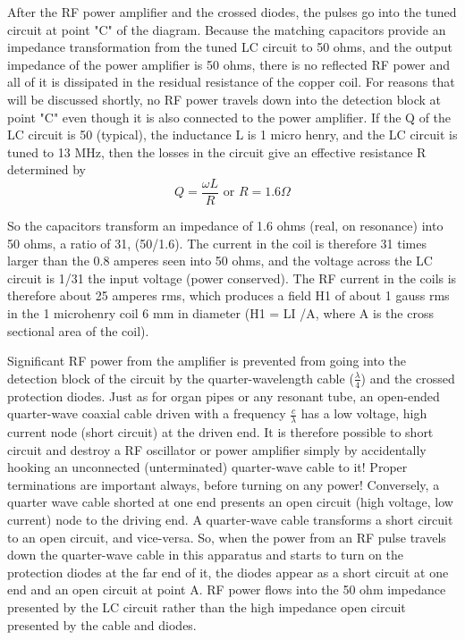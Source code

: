 \documentclass{../lab}
\begin{document}
After the RF power amplifier and the crossed diodes, the pulses go into the tuned circuit at point "C" of the diagram. Because the matching capacitors provide an impedance transformation from the tuned LC circuit to 50 ohms, and the output impedance of the power amplifier is 50 ohms, there is no reflected RF power and all of it is dissipated in the residual resistance of the copper coil. For reasons that will be discussed shortly, no RF power travels down into the detection block at point "C" even though it is also connected to the power amplifier. If the Q of the LC circuit is 50 (typical), the inductance L is 1 micro henry, and the LC circuit is tuned to 13 MHz, then the losses in the circuit give an effective resistance R determined by
\begin{equation}
    Q = \frac{\omega L}{R} \text{ or } R = 1.6\Omega
\end{equation}

So the capacitors transform an impedance of 1.6 ohms (real, on resonance) into 50 ohms, a ratio of 31, (50/1.6). The current in the coil is therefore 31 times larger than the 0.8 amperes seen into 50 ohms, and the voltage across the LC circuit is 1/31 the input voltage (power conserved). The RF current in the coils is therefore about 25 amperes rms, which produces a field H1 of about 1 gauss rms in the 1 microhenry coil 6 mm in diameter (H1 = LI /A, where A is the cross sectional area of the coil).

Significant RF power from the amplifier is prevented from going into the detection block of the circuit by the quarter-wavelength cable ($\frac{\lambda}{4}$) and the crossed protection diodes. Just as for organ pipes or any resonant tube, an open-ended quarter-wave coaxial cable driven with a frequency $\frac{c}{\lambda}$ has a low voltage, high current node (short circuit) at the driven end. It is therefore possible to short circuit and destroy a RF oscillator or power amplifier simply by accidentally hooking an unconnected (unterminated) quarter-wave cable to it! Proper terminations are important always, before turning on any power! Conversely, a quarter wave cable shorted at one end presents an open circuit (high voltage, low current) node to the driving end. A quarter-wave cable transforms a short circuit to an open circuit, and vice-versa. So, when the power from an RF pulse travels down the quarter-wave cable in this apparatus and starts to turn on the protection diodes at the far end of it, the diodes appear as a short circuit at one end and an open circuit at point A. RF power flows into the 50 ohm impedance presented by the LC circuit rather than the high impedance open circuit presented by the cable and diodes.
 
\end{document}
